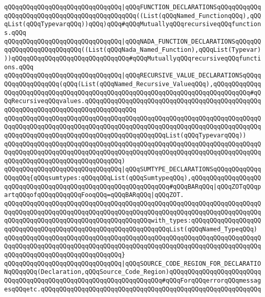\verb|qQQqqQQqqQQqqQQqqQQqqQQqqQQqqQQq|\verb#|qQQqFUNCTION_DECLARATIONSqQQqqQQqqQQqqQQqqQQqqQQqqQQqqQQqqQQqqQQqqQQqqQQq((List(qQQqNamed_FunctionqQQq),qQQqList(qQQqTypevarqQQq))qQQq)qQQq#\verb|#qQQqMutuallyqQQqrecursiveqQQqfunctions.qQQq|\newline
\verb|qQQqqQQqqQQqqQQqqQQqqQQqqQQqqQQq|\verb#|qQQqNADA_FUNCTION_DECLARATIONSqQQqqQQqqQQqqQQqqQQqqQQqqQQq((List(qQQqNada_Named_Function),qQQqList(Typevar)))qQQqqQQqqQQqqQQqqQQqqQQqqQQqqQQq#\verb|#qQQqMutuallyqQQqrecursiveqQQqfunctions.qQQq|\newline
\newline
\verb|qQQqqQQqqQQqqQQqqQQqqQQqqQQqqQQq|\verb#|qQQqRECURSIVE_VALUE_DECLARATIONSqQQqqQQqqQQqqQQqqQQq(qQQq(List(qQQqNamed_Recursive_ValueqQQq),qQQqqQQqqQQqqQQqqQQqqQQqqQQqqQQqqQQqqQQqqQQqqQQqqQQqqQQqqQQqqQQqqQQqqQQqqQQqqQQq#\verb|#qQQqRecursiveqQQqvalues.qQQqqQQqqQQqqQQqqQQqqQQqqQQqqQQqqQQqqQQqqQQqqQQqqQQqqQQqqQQqqQQqqQQqqQQqqQQqqQQqqQQq|\newline
\verb|qQQqqQQqqQQqqQQqqQQqqQQqqQQqqQQqqQQqqQQqqQQqqQQqqQQqqQQqqQQqqQQqqQQqqQQqqQQqqQQqqQQqqQQqqQQqqQQqqQQqqQQqqQQqqQQqqQQqqQQqqQQqqQQqqQQqqQQqqQQqqQQqqQQqqQQqqQQqqQQqqQQqqQQqqQQqqQQqqQQqqQQqList(qQQqTypevarqQQq))|\newline
\verb|qQQqqQQqqQQqqQQqqQQqqQQqqQQqqQQqqQQqqQQqqQQqqQQqqQQqqQQqqQQqqQQqqQQqqQQqqQQqqQQqqQQqqQQqqQQqqQQqqQQqqQQqqQQqqQQqqQQqqQQqqQQqqQQqqQQqqQQqqQQqqQQqqQQqqQQqqQQqqQQqqQQqqQQqqQQq)|\newline
\newline
\verb|qQQqqQQqqQQqqQQqqQQqqQQqqQQqqQQq|\verb#|qQQqSUMTYPE_DECLARATIONSqQQqqQQqqQQqqQQqqQQq{qQQqsumtypes:qQQqqQQqList(qQQqSumtypeqQQq),qQQqqQQqqQQqqQQqqQQqqQQqqQQqqQQqqQQqqQQqqQQqqQQqqQQqqQQqqQQqqQQq#\verb|#qQQqBARqQQq|\verb#|qQQqZOTqQQqpartqQQqofqQQqqQQqqQQqFooqQQq=qQQqBARqQQq|qQQqZOT.#\newline
\verb|qQQqqQQqqQQqqQQqqQQqqQQqqQQqqQQqqQQqqQQqqQQqqQQqqQQqqQQqqQQqqQQqqQQqqQQqqQQqqQQqqQQqqQQqqQQqqQQqqQQqqQQqqQQqqQQqqQQqqQQqqQQqqQQqqQQqqQQqqQQqqQQqqQQqqQQqqQQqqQQqqQQqqQQqqQQqqQQqqQQqwith_types:qQQqqQQqqQQqqQQqqQQqqQQqqQQqqQQqqQQqqQQqqQQqqQQqqQQqqQQqqQQqqQQqList(qQQqNamed_TypeqQQq)|\newline
\verb|qQQqqQQqqQQqqQQqqQQqqQQqqQQqqQQqqQQqqQQqqQQqqQQqqQQqqQQqqQQqqQQqqQQqqQQqqQQqqQQqqQQqqQQqqQQqqQQqqQQqqQQqqQQqqQQqqQQqqQQqqQQqqQQqqQQqqQQqqQQqqQQqqQQqqQQqqQQqqQQqqQQqqQQqqQQq}|\newline
\newline
\verb|qQQqqQQqqQQqqQQqqQQqqQQqqQQqqQQq|\verb#|qQQqSOURCE_CODE_REGION_FOR_DECLARATIONqQQqqQQq(Declaration,qQQqSource_Code_Region)qQQqqQQqqQQqqQQqqQQqqQQqqQQqqQQqqQQqqQQqqQQqqQQqqQQqqQQqqQQqqQQqqQQq#\verb|#qQQqForqQQqerrorqQQqmessagesqQQqetc.qQQqqQQqqQQqqQQqqQQqqQQqqQQqqQQqqQQqqQQqqQQqqQQqqQQqqQQqqQQq|\newline
